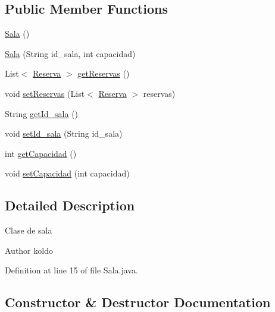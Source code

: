 \subsection*{Public Member Functions}
\begin{DoxyCompactItemize}
\item 
\mbox{\hyperlink{classes_1_1deusto_1_1spq_1_1biblioteca_1_1data_1_1_sala_a279622caa0a752be5cd4650c7caf62e3}{Sala}} ()
\item 
\mbox{\hyperlink{classes_1_1deusto_1_1spq_1_1biblioteca_1_1data_1_1_sala_a106c45adad643d12795f86a4d6a6bfcc}{Sala}} (String id\+\_\+sala, int capacidad)
\item 
List$<$ \mbox{\hyperlink{classes_1_1deusto_1_1spq_1_1biblioteca_1_1data_1_1_reserva}{Reserva}} $>$ \mbox{\hyperlink{classes_1_1deusto_1_1spq_1_1biblioteca_1_1data_1_1_sala_a87598dd743b450a1bd6682a44a112d79}{get\+Reservas}} ()
\item 
void \mbox{\hyperlink{classes_1_1deusto_1_1spq_1_1biblioteca_1_1data_1_1_sala_a250c1f00b03d5ae3fb48c87189580c00}{set\+Reservas}} (List$<$ \mbox{\hyperlink{classes_1_1deusto_1_1spq_1_1biblioteca_1_1data_1_1_reserva}{Reserva}} $>$ reservas)
\item 
String \mbox{\hyperlink{classes_1_1deusto_1_1spq_1_1biblioteca_1_1data_1_1_sala_ad24b42d5a886015aeed4eedfb9eab26e}{get\+Id\+\_\+sala}} ()
\item 
void \mbox{\hyperlink{classes_1_1deusto_1_1spq_1_1biblioteca_1_1data_1_1_sala_ad0f59651a28b3ea02c1ae45cc8a2c24c}{set\+Id\+\_\+sala}} (String id\+\_\+sala)
\item 
int \mbox{\hyperlink{classes_1_1deusto_1_1spq_1_1biblioteca_1_1data_1_1_sala_a8a1f8ca9bb4be94771c7f07ebab21d2c}{get\+Capacidad}} ()
\item 
void \mbox{\hyperlink{classes_1_1deusto_1_1spq_1_1biblioteca_1_1data_1_1_sala_a9516cc76b7a35302d99ce7b8b8db9786}{set\+Capacidad}} (int capacidad)
\end{DoxyCompactItemize}


\subsection{Detailed Description}
Clase de sala \begin{DoxyAuthor}{Author}
koldo 
\end{DoxyAuthor}


Definition at line 15 of file Sala.\+java.



\subsection{Constructor \& Destructor Documentation}
\mbox{\label{classes_1_1deusto_1_1spq_1_1biblioteca_1_1data_1_1_sala_a279622caa0a752be5cd4650c7caf62e3}} 
